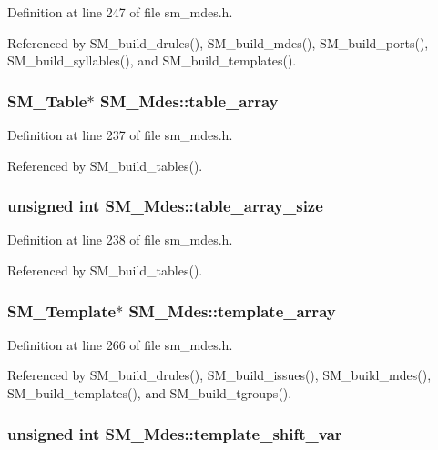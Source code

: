Definition at line 247 of file sm\_\-mdes.h.

Referenced by SM\_\-build\_\-drules(), SM\_\-build\_\-mdes(), SM\_\-build\_\-ports(), SM\_\-build\_\-syllables(), and SM\_\-build\_\-templates().
\subsubsection{\setlength{\rightskip}{0pt plus 5cm}\bf{SM\_\-Table}$\ast$ \bf{SM\_\-Mdes::table\_\-array}}\label{structSM__Mdes_29e3b4976fbe1e1888bec1f9bccd53c6}




Definition at line 237 of file sm\_\-mdes.h.

Referenced by SM\_\-build\_\-tables().
\subsubsection{\setlength{\rightskip}{0pt plus 5cm}unsigned int \bf{SM\_\-Mdes::table\_\-array\_\-size}}\label{structSM__Mdes_9706ef21d2002ace0c5a3e70add5d122}




Definition at line 238 of file sm\_\-mdes.h.

Referenced by SM\_\-build\_\-tables().
\subsubsection{\setlength{\rightskip}{0pt plus 5cm}\bf{SM\_\-Template}$\ast$ \bf{SM\_\-Mdes::template\_\-array}}\label{structSM__Mdes_9ff2c79b9d7f0675a4711d4b0e6d721a}




Definition at line 266 of file sm\_\-mdes.h.

Referenced by SM\_\-build\_\-drules(), SM\_\-build\_\-issues(), SM\_\-build\_\-mdes(), SM\_\-build\_\-templates(), and SM\_\-build\_\-tgroups().
\subsubsection{\setlength{\rightskip}{0pt plus 5cm}unsigned int \bf{SM\_\-Mdes::template\_\-shift\_\-var}}\label{structSM__Mdes_b7721b0722e0c0865c713ade86511a76}




